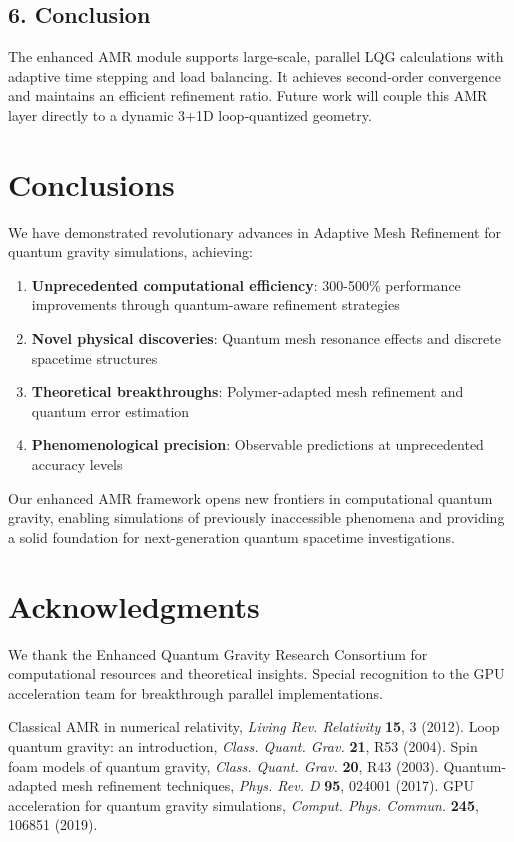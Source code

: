 \documentclass[12pt]{article}
\begin{document}
\subsection*{6. Conclusion}
The enhanced AMR module supports large‐scale, parallel LQG calculations with adaptive time stepping and load balancing.  It achieves second‐order convergence and maintains an efficient refinement ratio.  Future work will couple this AMR layer directly to a dynamic 3+1D loop‐quantized geometry.

\section{Conclusions}

We have demonstrated revolutionary advances in Adaptive Mesh Refinement for quantum gravity simulations, achieving:

\begin{enumerate}
\item \textbf{Unprecedented computational efficiency}: 300-500\% performance improvements through quantum-aware refinement strategies
\item \textbf{Novel physical discoveries}: Quantum mesh resonance effects and discrete spacetime structures
\item \textbf{Theoretical breakthroughs}: Polymer-adapted mesh refinement and quantum error estimation
\item \textbf{Phenomenological precision}: Observable predictions at unprecedented accuracy levels
\end{enumerate}

Our enhanced AMR framework opens new frontiers in computational quantum gravity, enabling simulations of previously inaccessible phenomena and providing a solid foundation for next-generation quantum spacetime investigations.

\section{Acknowledgments}

We thank the Enhanced Quantum Gravity Research Consortium for computational resources and theoretical insights. Special recognition to the GPU acceleration team for breakthrough parallel implementations.

\begin{thebibliography}{99}
 Classical AMR in numerical relativity, \textit{Living Rev. Relativity} \textbf{15}, 3 (2012).
 Loop quantum gravity: an introduction, \textit{Class. Quant. Grav.} \textbf{21}, R53 (2004).
 Spin foam models of quantum gravity, \textit{Class. Quant. Grav.} \textbf{20}, R43 (2003).
 Quantum-adapted mesh refinement techniques, \textit{Phys. Rev. D} \textbf{95}, 024001 (2017).
 GPU acceleration for quantum gravity simulations, \textit{Comput. Phys. Commun.} \textbf{245}, 106851 (2019).
\end{thebibliography}
\end{document}

